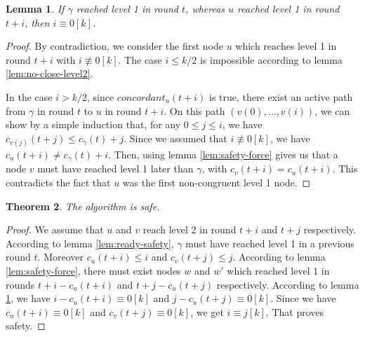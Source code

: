 \documentclass[11pt,letterpaper]{article}
\renewcommand{\leq}{\leqslant}
\newtheorem{thm}{Theorem}
\newtheorem{lem}[thm]{Lemma}
\newcommand{\cent}{\gamma}
\begin{document}
\begin{lem} \label{lem:later-level1}
	If $\cent$ reached level 1 in round $t$, whereas $u$ reached level 1 in round $t+i$, then $i \equiv 0 [k]$. 
\end{lem}
\begin{proof}
	By contradiction, we consider the first node $u$ which reaches level 1 in round $t+i$ with $i \not\equiv 0 [k]$.
	The case $i \leq k/2$ is impossible according to lemma \ref{lem:no-close-level2}.

	In the case $i > k/2$, since $concordant_u(t+i)$ is true, there exist an active path from $\cent$ in round $t$ to $u$ in round $t+i$.
	On this path $(v(0), \dots, v(i))$, we can show by a simple induction that, for any $0 \leq j \leq i$, we have $c_{v(j)}(t+j) \leq c_\cent(t)+j$.
	Since we assumed that $i \not\equiv 0[k]$, we have $c_u(t+i) \neq c_\cent(t)+i$.
	Then, using lemma \ref{lem:safety-force} gives us that a node $v$ must have reached level 1 later than $\cent$, with $c_v(t+i) = c_u(t+i)$.
	This contradicts the fact that $u$ was the first non-congruent level 1 node.
\end{proof}

\begin{thm} \label{lem:safety} 
	The algorithm is safe.
\end{thm}
\begin{proof}
	We assume that $u$ and $v$ reach level 2 in round $t+i$ and $t+j$ respectively.
	According to lemma \ref{lem:ready-safety}, $\cent$ must have reached level 1 in a previous round $t$.
	Moreover $c_u(t+i) \leq i$ and $c_v(t+j) \leq j$.
	According to lemma \ref{lem:safety-force}, there must exist nodes $w$ and $w'$ which reached level 1 in rounds $t+i-c_u(t+i)$ and $t+j-c_u(t+j)$ respectively.
	According to lemma \ref{lem:later-level1}, we have $i-c_u(t+i) \equiv 0 [k]$ and $j-c_u(t+j) \equiv 0 [k]$. 
	Since we have $c_u(t+i) \equiv 0 [k]$ and $c_v(t+j) \equiv 0 [k]$, we get $i \equiv j [k]$. That proves safety.
\end{proof}
\end{document}
